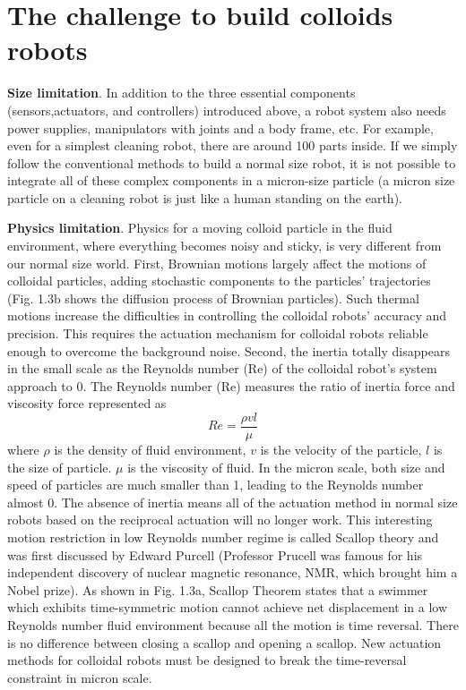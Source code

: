 \section{The challenge to  build colloids robots}

\textbf{Size limitation}. In addition to the three essential components (sensors,actuators, and controllers) introduced above, a robot system also needs power supplies, manipulators with joints and a body frame, etc. For example,  even for a simplest cleaning robot, there are around 100 parts inside. If we simply follow the conventional methods to build a normal size robot, it is not possible to integrate all of these complex components in a micron-size particle (a micron size particle on a cleaning robot is just like a human standing on the earth).  

\textbf{Physics limitation}. Physics for a moving colloid particle in the fluid environment, where everything becomes noisy and sticky, is very different from our normal size world. First, Brownian motions largely affect the motions of colloidal particles, adding stochastic components to the particles' trajectories (Fig. 1.3b shows the diffusion process of Brownian particles). Such thermal motions increase the difficulties in controlling the colloidal robots' accuracy and precision. This requires the actuation mechanism for colloidal robots reliable enough to overcome the background noise. Second, the inertia totally disappears in the small scale as the Reynolds number (Re) of the colloidal robot's system approach to 0.  The Reynolds number (Re) measures the ratio of inertia force and viscosity force represented as
\begin{equation}
    Re=\frac{\rho v l}{\mu}
\end{equation}
where $\rho $ is the density of fluid environment, $v$ is the velocity of the particle, $l$ is the size of particle. $\mu$ is the  viscosity of fluid. In the micron scale, both size and speed of particles are much smaller than 1, leading to the Reynolds number almost 0. The absence of inertia means all of the actuation method in normal size robots based on the reciprocal actuation will no longer work. This interesting  motion restriction in low Reynolds number regime is called Scallop
theory and was first discussed by Edward Purcell\autocite{purcell1977life} (Professor Prucell was famous for his independent discovery of nuclear magnetic resonance, NMR, which brought him a Nobel prize). As shown in Fig. 1.3a, Scallop Theorem states that a swimmer which exhibits time-symmetric motion cannot achieve net displacement in a low Reynolds number fluid environment because all the motion is time reversal. There is no difference between closing a scallop and opening a scallop. New actuation methods for colloidal robots must be designed to break the time-reversal constraint in micron scale. 

